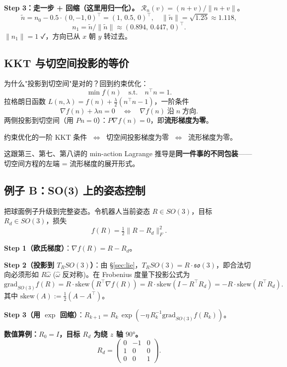 \documentclass[11pt,a4paper]{article}
\theoremstyle{mythm}
\theoremstyle{mydef}
\begin{document}
\textbf{Step 3：走一步 + 回缩（这里用归一化）。}
$\mathcal{R}_n(v) = (n+v)/\|n+v\|$。
$$\tilde n = n_0 - 0.5 \cdot (0,-1,0)^\top = (1,\,0.5,\,0)^\top,\quad \|\tilde n\| = \sqrt{1.25} \approx 1.118,$$
$$n_1 = \tilde n / \|\tilde n\| \approx (0.894,\,0.447,\,0)^\top.$$
$\|n_1\| = 1$ ✓，方向已从 $x$ 朝 $y$ 转过去。

\subsection{KKT 与切空间投影的等价}

为什么"投影到切空间"是对的？回到约束优化：
$$\min f(n)\quad \text{s.t.}\quad n^\top n = 1.$$
拉格朗日函数 $L(n,\lambda) = f(n) + \tfrac{\lambda}{2}(n^\top n - 1)$，一阶条件
$$\nabla f(n) + \lambda n = 0\quad\Longleftrightarrow\quad \nabla f(n)\;\text{沿}\;n\;\text{方向}.$$
两侧投影到切空间（用 $Pn = 0$）：$P\nabla f(n) = 0$，即\textbf{流形梯度为零}。

\begin{tcolorbox}[colback=blue!3,colframe=blue!50!black]
约束优化的一阶 KKT 条件 $\;\Longleftrightarrow\;$ 切空间投影梯度为零 $\;\Longleftrightarrow\;$ 流形梯度为零。
\end{tcolorbox}

这跟第三、第七、第八讲的 min-action Lagrange 推导是\textbf{同一件事的不同包装}——切空间方程的左端 = 流形梯度的展开形式。

\subsection{例子 B：SO(3) 上的姿态控制}

把球面例子升级到完整姿态。令机器人当前姿态 $R \in SO(3)$，目标 $R_d \in SO(3)$，损失
$$f(R) = \tfrac{1}{2}\|R - R_d\|_F^2.$$

\textbf{Step 1（欧氏梯度）}：$\nabla f(R) = R - R_d$。

\textbf{Step 2（投影到 $T_R SO(3)$）}：由 §\ref{sec:lie}，$T_R SO(3) = R\cdot \mathfrak{so}(3)$，即合法切向必须形如 $R\hat\omega$ ($\hat\omega$ 反对称)。在 Frobenius 度量下投影公式为
$$\mathrm{grad}_{SO(3)} f(R) = R\cdot \mathrm{skew}(R^\top\nabla f(R)) = R\cdot \mathrm{skew}(I - R^\top R_d) = -R\cdot\mathrm{skew}(R^\top R_d).$$
其中 $\mathrm{skew}(A) := \tfrac{1}{2}(A - A^\top)$。

\textbf{Step 3（用 $\exp$ 回缩）}：$R_{k+1} = R_k\,\exp(-\eta\,R_k^{-1} \mathrm{grad}_{SO(3)} f(R_k))$。

\textbf{数值算例：$R_0 = I$，目标 $R_d$ 为绕 $z$ 轴 $90°$。}
$$R_d = \begin{pmatrix}0 & -1 & 0\\ 1 & 0 & 0\\ 0 & 0 & 1\end{pmatrix}.$$
\end{document}
